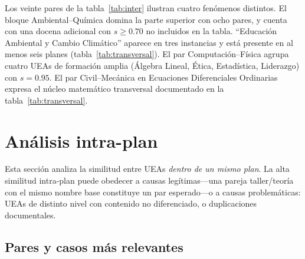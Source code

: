 \documentclass[11pt,a4paper]{article}
\begin{document}
Los veinte pares de la tabla~\ref{tab:inter} ilustran cuatro fenómenos distintos.
El bloque Ambiental--Química domina la parte superior con ocho pares, y cuenta con una docena adicional con $s \geq 0.70$ no incluidos en la tabla.
``Educación Ambiental y Cambio Climático'' aparece en tres instancias y está presente en al menos seis planes (tabla~\ref{tab:transversal}).
El par Computación--Física agrupa cuatro UEAs de formación amplia (Álgebra Lineal, Ética, Estadística, Liderazgo) con $s = 0.95$.
El par Civil--Mecánica en Ecuaciones Diferenciales Ordinarias expresa el núcleo matemático transversal documentado en la tabla~\ref{tab:transversal}.

\section{Análisis intra-plan}
\label{sec:intra}

Esta sección analiza la similitud entre UEAs \textit{dentro de un mismo plan}.
La alta similitud intra-plan puede obedecer a causas legítimas---una pareja taller/teoría con el mismo nombre base constituye un par esperado---o a causas problemáticas: UEAs de distinto nivel con contenido no diferenciado, o duplicaciones documentales.

\subsection{Pares y casos más relevantes}
\end{document}
